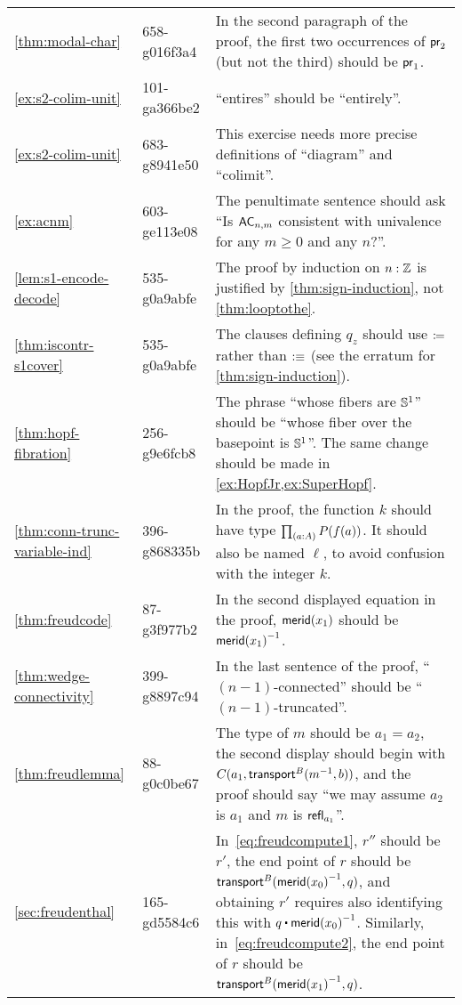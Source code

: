\documentclass[
%
%
11pt %
]{article}
\begin{document}
\begin{longtable}{llp{10.5cm}}
  \cref{thm:modal-char}
  & 658-g016f3a4
  & In the second paragraph of the proof, the first two occurrences of $\mathsf{pr}_{2}$ (but not the third) should be $\mathsf{pr}_{1}$.\\
  \cref{ex:s2-colim-unit}
  & 101-ga366be2
  & ``entires'' should be ``entirely''.\\
  \cref{ex:s2-colim-unit}
  & 683-g8941e50
  & This exercise needs more precise definitions of ``diagram'' and ``colimit''.\\
  \cref{ex:acnm}
  & 603-ge113e08
  & The penultimate sentence should ask ``Is $\mathsf{AC}_{n,m}$ consistent with univalence for any $m\ge 0$ and any $n$?''.\\
  \cref{lem:s1-encode-decode}
  & 535-g0a9abfe
  & The proof by induction on $n:\mathbb{Z}$ is justified by \cref{thm:sign-induction}, not \cref{thm:looptothe}.\\
  \cref{thm:iscontr-s1cover}
  & 535-g0a9abfe
  & The clauses defining $q_z$ should use $\coloneqq$ rather than $\vcentcolon\equiv$ (see the erratum for \cref{thm:sign-induction}).\\
  \cref{thm:hopf-fibration}
  & 256-g9e6fcb8
  & The phrase ``whose fibers are $\mathbb{S}^1$'' should be ``whose fiber over the basepoint is $\mathbb{S} ^1$''.
  The same change should be made in \cref{ex:HopfJr,ex:SuperHopf}.\\
  \cref{thm:conn-trunc-variable-ind}
  & 396-g868335b
  & In the proof, the function $k$ should have type $\prd{a:A} P(f(a))$.
  It should also be named $\ell$, to avoid confusion with the integer $k$.\\
  \cref{thm:freudcode}
  & 87-g3f977b2
  & In the second displayed equation in the proof, $\mathsf{merid}(x_1)$ should be $\mathord{{\mathsf{merid}(x_1)}^{-1}}$.\\
  \cref{thm:wedge-connectivity}
  & 399-g8897c94
  & In the last sentence of the proof, ``$(n-1)$-connected'' should be ``$(n-1)$-truncated''.\\
  \cref{thm:freudlemma}
  & 88-g0c0be67
  & The type of $m$ should be $a_1=a_2$, the second display should begin with $C(a_1,\mathsf{transport}^{B}(\mathord{{m}^{-1}},b))$, and the proof should say ``we may assume $a_2$ is $a_1$ and $m$ is $\mathsf{refl}_{a_1}$''.\\
  \cref{sec:freudenthal}
  & 165-gd5584c6
  & In~\eqref{eq:freudcompute1}, $r''$ should be $r'$, the end point of $r$ should be $\mathsf{transport}^{B}(\mathord{{\mathsf{merid}(x_0)}^{-1}},q)$, and obtaining $r'$ requires also identifying this with $q \ct \opp{\merid(x_0)}$.
  Similarly, in~\eqref{eq:freudcompute2}, the end point of $r$ should be $\mathsf{transport}^{B}(\mathord{{\mathsf{merid}(x_1)}^{-1}},q)$.\\

\end{longtable}
\end{document}
